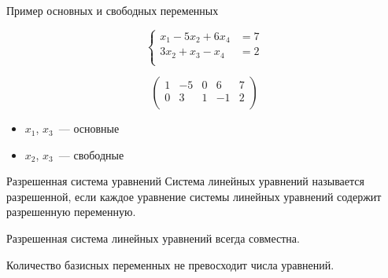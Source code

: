 \documentclass[unicode,11pt,notheorems]{beamer}
\begin{document}
\begin{frame}{Пример основных и свободных переменных}

	$$	\left\lbrace
		\begin{aligned}
			x_1 - 5x_2 + 6x_4 &= 7\\
			3x_2 + x_3 - x_4 &= 2\\
		\end{aligned}
		\right.
	$$
	
	$$
	\left(
	\begin{array}{cccc|c}
	1 & -5 & 0& 6 & 7\\
	0 & 3 & 1 &- 1 & 2\\
	\end{array}
	\right)
	$$
\begin{itemize}
\item $x_1$, $x_3$~--- основные
\item $x_2$, $x_3$~--- свободные
\end{itemize}
\end{frame}
\begin{frame}{Разрешенная система уравнений}
Система линейных уравнений называется \alert{разрешенной}, если каждое уравнение системы линейных уравнений содержит разрешенную переменную. 

Разрешенная система линейных уравнений всегда совместна.

\begin{block}{}
Количество базисных переменных не превосходит числа уравнений. 
\end{block}
\end{frame}
\end{document}

